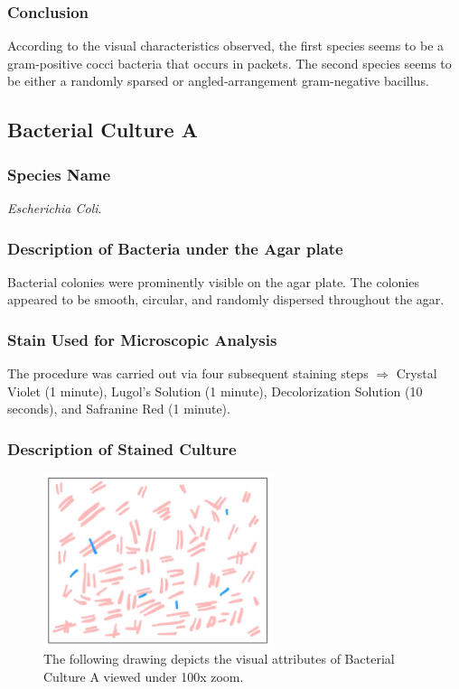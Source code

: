 \documentclass[pdflatex,sn-mathphys]{sn-jnl}%
\theoremstyle{thmstyleone}%
\theoremstyle{thmstyletwo}%
\theoremstyle{thmstylethree}%
\begin{document}
\subsubsection{Conclusion}
According to the visual characteristics observed, the first species seems to be
a gram-positive cocci bacteria that occurs in packets. The second species seems
to be either a randomly sparsed or angled-arrangement gram-negative bacillus.

\subsection{Bacterial Culture A}\label{subsec:culture_a}
\subsubsection{Species Name}
\textit{Escherichia Coli}.
\subsubsection{Description of Bacteria under the Agar plate}
Bacterial colonies were prominently visible on the agar plate. The colonies
appeared to be smooth, circular, and randomly dispersed throughout the agar.
\subsubsection{Stain Used for Microscopic Analysis}
The procedure was carried out via four subsequent staining steps $\Rightarrow$
Crystal Violet (1 minute), Lugol's Solution (1 minute), Decolorization Solution
(10 seconds), and Safranine Red (1 minute).

\subsubsection{Description of Stained Culture}
\begin{figure}[h]%
  \centering
  \includegraphics[width=0.6\textwidth]{photos/A.jpg}
  \caption{The following drawing depicts the visual attributes of Bacterial Culture A viewed under 100x zoom. }\label{fig:culture_a}
\end{figure}
\end{document}
